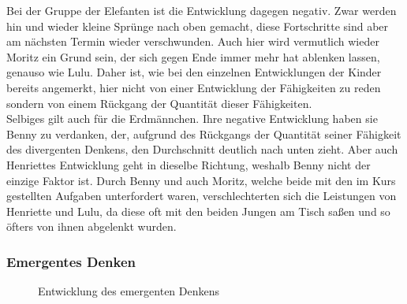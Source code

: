 Bei der Gruppe der Elefanten ist die Entwicklung dagegen negativ. Zwar werden hin und wieder kleine Sprünge nach oben gemacht, diese Fortschritte sind aber am nächsten Termin wieder verschwunden. Auch hier wird vermutlich wieder Moritz ein Grund sein, der sich gegen Ende immer mehr hat ablenken lassen, genauso wie Lulu. Daher ist, wie bei den einzelnen Entwicklungen der Kinder bereits angemerkt, hier nicht von einer Entwicklung der Fähigkeiten zu reden sondern von einem Rückgang der Quantität dieser Fähigkeiten.\\
Selbiges gilt auch für die Erdmännchen. Ihre negative Entwicklung haben sie Benny zu verdanken, der, aufgrund des Rückgangs der Quantität seiner Fähigkeit des divergenten Denkens, den Durchschnitt deutlich nach unten zieht. Aber auch Henriettes Entwicklung geht in dieselbe Richtung, weshalb Benny nicht der einzige Faktor ist. Durch Benny und auch Moritz, welche beide mit den im Kurs gestellten Aufgaben unterfordert waren, verschlechterten sich die Leistungen von Henriette und Lulu, da diese oft mit den beiden Jungen am Tisch saßen und so öfters von ihnen abgelenkt wurden. 
\subsubsection{Emergentes Denken}
\begin{figure}[H]
	\centering
	\caption{Entwicklung des emergenten Denkens}
\end{figure}	



